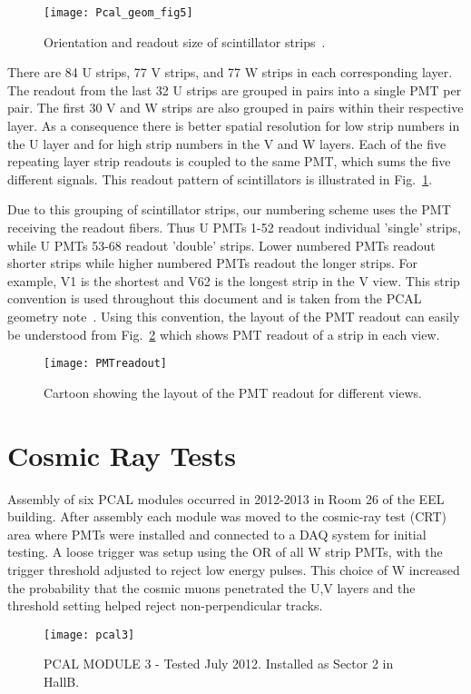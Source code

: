 \FloatBarrier
\begin{figure}[h]
    \centering
    \texttt{[image: Pcal\_geom\_fig5]}
    \caption{Orientation and readout size of scintillator strips~\cite{bib:geomnote}.}
    \label{fig:geomfig5}
\end{figure}
\FloatBarrier

\FloatBarrier
There are 84 U strips, 77 V strips, and 77 W strips in each corresponding layer. The readout from the last 32 U strips are grouped in pairs into a single PMT per pair. The first 30 V and W strips are also grouped in pairs within their respective layer. As a consequence 
there is better spatial resolution for low strip numbers in the U layer and for high strip numbers in the V and W layers. Each of the five repeating layer strip readouts is coupled to the same PMT, which sums the five different signals. This readout pattern of scintillators is illustrated in Fig.~\ref{fig:geomfig5}.

Due to this grouping of scintillator strips, our numbering scheme uses the PMT receiving the readout fibers. Thus U PMTs 1-52 readout individual 'single' strips, while U PMTs 53-68 readout 'double' strips. Lower numbered PMTs readout shorter strips while higher numbered PMTs readout the longer strips.  For example, V1 is the shortest and V62 is the longest strip in the V view. This strip convention is used throughout this document and is taken from the PCAL geometry note~\cite{bib:geomnote}. Using this convention, the layout of the PMT readout can easily be understood from Fig.~\ref{fig:PMTreadout} which shows PMT readout of a strip in each view.
\begin{figure}[h]
    \centering
    \texttt{[image: PMTreadout]}
    \caption{Cartoon showing the layout of the PMT readout for different views.}
    \label{fig:PMTreadout}
\end{figure}
\FloatBarrier


\section{Cosmic Ray Tests}
Assembly of six PCAL modules occurred in 2012-2013 in Room 26 of the EEL building.  After assembly each module was moved to the cosmic-ray test (CRT) area where PMTs were installed and connected to a DAQ system for initial testing.  A loose trigger was setup using the OR of all W strip PMTs, with the trigger threshold adjusted to reject low energy pulses.  This choice of W increased the probability that the cosmic muons penetrated the U,V layers and the threshold setting helped reject non-perpendicular tracks.
\begin{figure}[h]
    \centering
    \texttt{[image: pcal3]}
    \caption{PCAL MODULE 3 - Tested July 2012. Installed as Sector 2 in HallB.}
    \label{fig:pcal3}
\end{figure}

